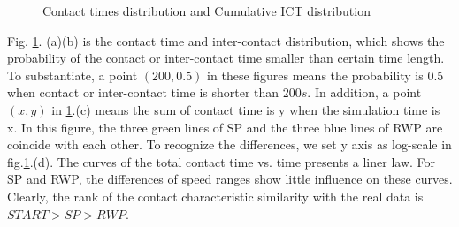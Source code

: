 \begin{figure}
\centering
{}
\caption{Contact times distribution and Cumulative ICT distribution}\label{figure_contacts}
\end{figure}

Fig. \ref{figure_contacts}. (a)(b) is the contact time and inter-contact distribution, which shows the probability of the contact or inter-contact time smaller than certain time length. To substantiate, a point $(200,0.5)$ in these figures means the probability is 0.5 when contact or inter-contact time is shorter than $200s$. In addition, a point $(x,y)$ in \ref{figure_contacts}.(c) means the sum of contact time is y when the simulation time is x. In this figure, the three green lines of SP and the three blue lines of RWP are coincide with each other. To recognize the differences, we set y axis as log-scale in fig.\ref{figure_contacts}.(d).
The curves of the total contact time vs. time presents a liner law. For SP and RWP, the differences of speed ranges show little influence on these curves.
Clearly, the rank of the contact characteristic similarity with the real data is $START>SP>RWP$.


